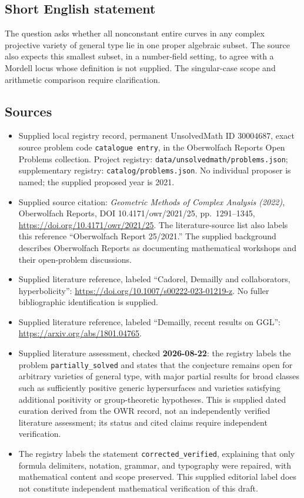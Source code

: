 \documentclass[11pt]{article}
\begin{document}
\subsection{Short English statement}
The question asks whether all nonconstant entire curves in any complex projective variety of general type lie in one proper algebraic subset. The source also expects this smallest subset, in a number-field setting, to agree with a Mordell locus whose definition is not supplied. The singular-case scope and arithmetic comparison require clarification.
\subsection{Sources}
\begin{itemize}
\item Supplied local registry record, permanent UnsolvedMath ID \(30004687\), exact source problem code \texttt{catalogue entry}, in the Oberwolfach Reports Open Problems collection. Project registry: \texttt{data/unsolvedmath/problems.json}; supplementary registry: \texttt{catalog/problems.json}. No individual proposer is named; the supplied proposed year is 2021.
\item Supplied source citation: \emph{Geometric Methods of Complex Analysis (2022)}, Oberwolfach Reports, DOI 10.4171/owr/2021/25, pp.\ 1291--1345, \url{https://doi.org/10.4171/owr/2021/25}. The literature-source list also labels this reference ``Oberwolfach Report 25/2021.'' The supplied background describes Oberwolfach Reports as documenting mathematical workshops and their open-problem discussions.
\item Supplied literature reference, labeled ``Cadorel, Demailly and collaborators, hyperbolicity'': \url{https://doi.org/10.1007/s00222-023-01219-z}. No fuller bibliographic identification is supplied.
\item Supplied literature reference, labeled ``Demailly, recent results on GGL'': \url{https://arxiv.org/abs/1801.04765}.
\item Supplied literature assessment, checked \textbf{2026-08-22}: the registry labels the problem \texttt{partially\_solved} and states that the conjecture remains open for arbitrary varieties of general type, with major partial results for broad classes such as sufficiently positive generic hypersurfaces and varieties satisfying additional positivity or group-theoretic hypotheses. This is supplied dated curation derived from the OWR record, not an independently verified literature assessment; its status and cited claims require independent verification.
\item The registry labels the statement \texttt{corrected\_verified}, explaining that only formula delimiters, notation, grammar, and typography were repaired, with mathematical content and scope preserved. This supplied editorial label does not constitute independent mathematical verification of this draft.
\end{itemize}
\end{document}
